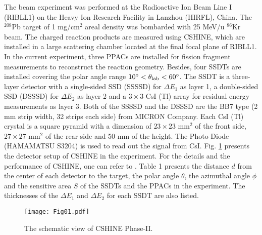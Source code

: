 \documentclass[submitting]{nst}
\begin{document}
The beam experiment was performed at the Radioactive Ion Beam Line I  (RIBLL1) on the Heavy Ion Research Facility in Lanzhou (HIRFL), China. The $^{208}$Pb target of 1 mg/cm$^2$ areal density was bombarded with 25 MeV/u $^{86}$Kr beam.  
The charged  reaction products are measured using CSHINE, which are installed in a large scattering chamber located at the final focal plane of RIBLL1.  In the current experiment, three PPACs are installed for fission fragment measurements to reconstruct the reaction geometry. Besides, four SSDTs  are installed covering the polar angle range $10^\circ<\theta_{\rm lab}<60^\circ$.  The SSDT is a three-layer detector with a single-sided  SSD (SSSSD) for $\Delta E_1$ as layer 1, a  double-sided SSD (DSSSD) for $\Delta E_2$ as layer 2 and a  $3\times3$ CsI (Tl) array for residual energy measurements as layer 3.  Both of the SSSSD and the DSSSD are the BB7 type (2 mm strip width, 32 strips each side) from MICRON Company.  Each CsI (Tl) crystal is a square pyramid with a dimension of  $23\times23$ mm$^2$ of the front side, $27\times27$ mm$^2$ of the rear side and 50 mm of the height. The  Photo Diode (HAMAMATSU  S3204) is used to read out the signal from CsI.  Fig. \ref{cshine} presents the detector setup of CSHINE in the experiment. For the details and the performance  of CSHINE, one can refer to \cite{Wangyj2021,Guanfh2021}. Table 1 presents the distance $d$ from the center of each detector to the target, the polar angle $\theta$, the azimuthal  angle $\phi$ and the sensitive area $S$ of the SSDTs and the PPACs in the experiment. The thicknesses of the $\Delta E_1$  and $\Delta E_2$  for each SSDT are also listed.


\begin{figure}[!htb]
\texttt{[image: Fig01.pdf]}
\caption{The schematic view of CSHINE Phase-II.}
\label{cshine}
\end{figure}
\end{document}
